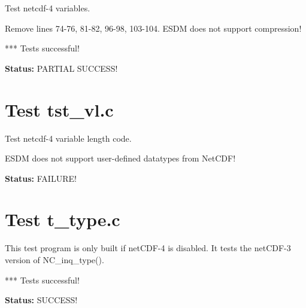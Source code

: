 Test netcdf-4 variables.

Remove lines 74-76, 81-82, 96-98, 103-104. ESDM does not support compression!

*** Tests successful!

{\bf \large Status: } PARTIAL SUCCESS!

\section{Test tst\_vl.c}

Test netcdf-4 variable length code.

ESDM does not support user-defined datatypes from NetCDF!

{\bf \large Status: } FAILURE!

\section{Test t\_type.c}

This test program is only built if netCDF-4 is disabled. It tests
   the netCDF-3 version of NC\_inq\_type().

*** Tests successful!

{\bf \large Status: } SUCCESS!
